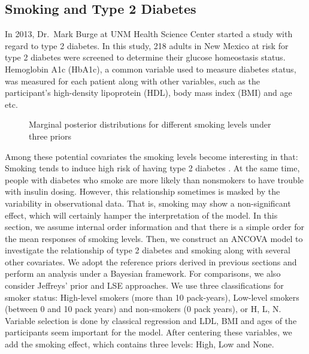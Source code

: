 \documentclass[Proceedings]{ascelike}
\begin{document}
\subsection{Smoking and Type 2 Diabetes}
In 2013, Dr.\ Mark Burge at UNM Health Science Center started a study with regard to type 2 diabetes. In this study, 218 adults in New Mexico at risk for type 2 diabetes were screened to determine their glucose homeostasis status. Hemoglobin A1c (HbA1c), a common variable used to measure diabetes status, was measured for each patient along with other variables, such as the participant's high-density lipoprotein (HDL), body mass index (BMI) and age etc. \\
\begin{figure}[h!]
\centering
{}
\caption{Marginal posterior distributions for different smoking levels under three priors}
\label{fig:HbA1c2}
\end{figure}
Among these potential covariates the smoking levels become interesting in that: Smoking tends to induce high risk of having type 2 diabetes \citep{smoking}. At the same time, people with diabetes who smoke are more likely than nonsmokers to have trouble with insulin dosing. However, this relationship sometimes is masked by the variability in observational data. That is, smoking may show a non-significant effect, which will certainly hamper the interpretation of the model. In this section, we assume internal order information and that there is a simple order for the mean responses of smoking levels. Then, we construct an ANCOVA model to investigate the relationship of type 2 diabetes and smoking along with several other covariates. We adopt the reference priors derived in previous sections and perform an analysis under a Bayesian framework. For comparisons, we also consider Jeffreys' prior and LSE approaches. We use three classifications for smoker status: High-level smokers (more than 10 pack-years), Low-level smokers (between 0 and 10 pack years) and non-smokers (0 pack years), or H, L, N. Variable selection is done by classical regression and LDL, BMI and ages of the participants seem important for the model. After centering these variables, we add the smoking effect, which contains three levels: High, Low and None.\\
\end{document}
